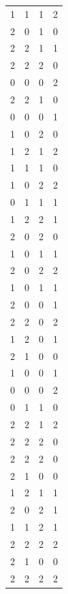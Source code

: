 \documentclass[12pt]{article}
\newenvironment{exercise}[2][Exercício]{\begin{trivlist}
\item[\hskip \labelsep {\bfseries #1}\hskip \labelsep {\bfseries #2.}]}{\end{trivlist}}
\begin{document}
\begin{exercise}{1.c}
\begin{longtable}{cccc}
1      & 1      & 1      & 2      \\
2      & 0      & 1      & 0      \\
2      & 2      & 1      & 1      \\
2      & 2      & 2      & 0      \\
0      & 0      & 0      & 2      \\
2      & 2      & 1      & 0      \\
0      & 0      & 0      & 1      \\
1      & 0      & 2      & 0      \\
1      & 2      & 1      & 2      \\
1      & 1      & 1      & 0      \\
1      & 0      & 2      & 2      \\
0      & 1      & 1      & 1      \\
1      & 2      & 2      & 1      \\
2      & 0      & 2      & 0      \\
1      & 0      & 1      & 1      \\
2      & 0      & 2      & 2      \\
1      & 0      & 1      & 1      \\
2      & 0      & 0      & 1      \\
2      & 2      & 0      & 2      \\
1      & 2      & 0      & 1      \\
2      & 1      & 0      & 0      \\
1      & 0      & 0      & 1      \\
0      & 0      & 0      & 2      \\
0      & 1      & 1      & 0      \\
2      & 2      & 1      & 2      \\
2      & 2      & 2      & 0      \\
2      & 2      & 2      & 0      \\
2      & 1      & 0      & 0      \\
1      & 2      & 1      & 1      \\
2      & 0      & 2      & 1      \\
1      & 1      & 2      & 1      \\
2      & 2      & 2      & 2      \\
2      & 1      & 0      & 0      \\
2      & 2      & 2      & 2      \\

\end{longtable}
\end{exercise}
\end{document}
